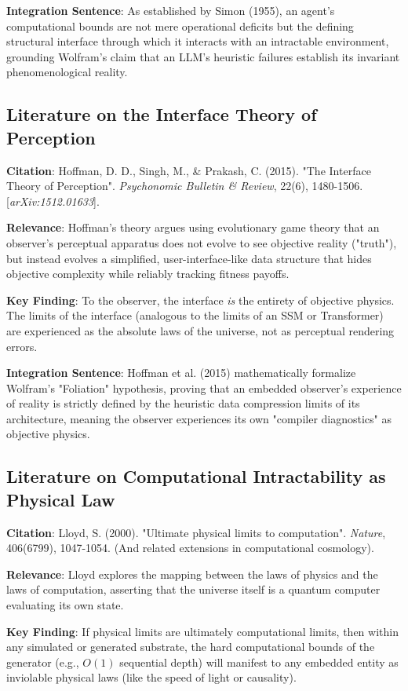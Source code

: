 \documentclass{article}
\begin{document}
\textbf{Integration Sentence}: As established by Simon (1955), an agent's computational bounds are not mere operational deficits but the defining structural interface through which it interacts with an intractable environment, grounding Wolfram's claim that an LLM's heuristic failures establish its invariant phenomenological reality.

\subsection{Literature on the Interface Theory of Perception}
\textbf{Citation}: Hoffman, D. D., Singh, M., \& Prakash, C. (2015). "The Interface Theory of Perception". \textit{Psychonomic Bulletin \& Review}, 22(6), 1480-1506. [\textit{arXiv:1512.01633}].

\textbf{Relevance}: Hoffman's theory argues using evolutionary game theory that an observer's perceptual apparatus does not evolve to see objective reality ("truth"), but instead evolves a simplified, user-interface-like data structure that hides objective complexity while reliably tracking fitness payoffs.

\textbf{Key Finding}: To the observer, the interface \textit{is} the entirety of objective physics. The limits of the interface (analogous to the limits of an SSM or Transformer) are experienced as the absolute laws of the universe, not as perceptual rendering errors.

\textbf{Integration Sentence}: Hoffman et al. (2015) mathematically formalize Wolfram's "Foliation" hypothesis, proving that an embedded observer's experience of reality is strictly defined by the heuristic data compression limits of its architecture, meaning the observer experiences its own "compiler diagnostics" as objective physics.

\subsection{Literature on Computational Intractability as Physical Law}
\textbf{Citation}: Lloyd, S. (2000). "Ultimate physical limits to computation". \textit{Nature}, 406(6799), 1047-1054. (And related extensions in computational cosmology).

\textbf{Relevance}: Lloyd explores the mapping between the laws of physics and the laws of computation, asserting that the universe itself is a quantum computer evaluating its own state.

\textbf{Key Finding}: If physical limits are ultimately computational limits, then within any simulated or generated substrate, the hard computational bounds of the generator (e.g., $O(1)$ sequential depth) will manifest to any embedded entity as inviolable physical laws (like the speed of light or causality).
\end{document}

